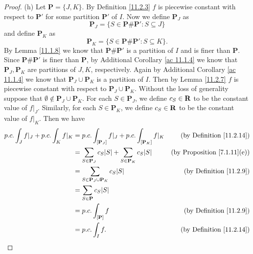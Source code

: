\begin{proof}{(h)}
    Let \(\mathbf{P} = \{J, K\}\).
    By Definition \ref{11.2.3} \(f\) is piecewise constant with respect to \(\mathbf{P}'\) for some partition \(\mathbf{P}'\) of \(I\).
    Now we define \(\mathbf{P}_J\) as
    \[
        \mathbf{P}_J = \{S \in \mathbf{P} \# \mathbf{P}' : S \subseteq J\}
    \]
    and define \(\mathbf{P}_K\) as
    \[
        \mathbf{P}_K = \{S \in \mathbf{P} \# \mathbf{P}' : S \subseteq K\}.
    \]
    By Lemma \ref{11.1.8} we know that \(\mathbf{P} \# \mathbf{P}'\) is a partition of \(I\) and is finer than \(\mathbf{P}\).
    Since \(\mathbf{P} \# \mathbf{P}'\) is finer than \(\mathbf{P}\), by Additional Corollary \ref{ac 11.1.4} we know that \(\mathbf{P}_J, \mathbf{P}_K\) are partitions of \(J, K\), respectively.
    Again by Additional Corollary \ref{ac 11.1.4} we know that \(\mathbf{P}_J \cup \mathbf{P}_K\) is a partition of \(I\).
    Then by Lemma \ref{11.2.7} \(f\) is piecewise constant with respect to \(\mathbf{P}_J \cup \mathbf{P}_K\).
    Without the loss of generality suppose that \(\emptyset \notin \mathbf{P}_J \cup \mathbf{P}_K\).
    For each \(S \in \mathbf{P}_J\), we define \(c_S \in \mathbf{R}\) to be the constant value of \(f|_J\).
    Similarly, for each \(S \in \mathbf{P}_K\), we define \(c_S \in \mathbf{R}\) to be the constant value of \(f|_K\).
    Then we have
    \begin{align*}
        p.c. \int_J f|_J + p.c. \int_K f|_K & = p.c. \int_{[\mathbf{P}_J]} f|_J + p.c. \int_{[\mathbf{P}_K]} f|_K             & \text{(by Definition \ref{11.2.14})}    \\
                                            & = \sum_{S \in \mathbf{P}_J} c_S \abs{S} + \sum_{S \in \mathbf{P}_K} c_S \abs{S} & \text{(by Proposition \ref{7.1.11}(e))} \\
                                            & = \sum_{S \in \mathbf{P}_J \cup \mathbf{P}_K} c_S \abs{S}                       & \text{(by Definition \ref{11.2.9})}     \\
                                            & = \sum_{S \in \mathbf{P}} c_S \abs{S}                                                                                     \\
                                            & = p.c. \int_{[\mathbf{P}]} f                                                    & \text{(by Definition \ref{11.2.9})}     \\
                                            & = p.c. \int_I f.                                                                & \text{(by Definition \ref{11.2.14})}
    \end{align*}
\end{proof}

